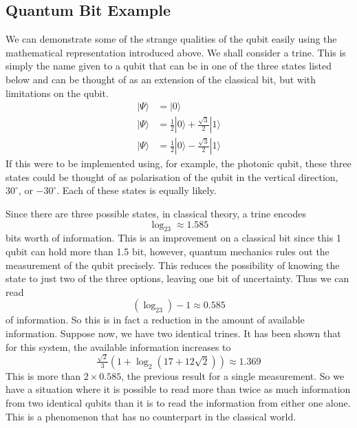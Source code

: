 \subsection{Quantum Bit Example}
We can demonstrate some of the strange qualities of the qubit easily using the mathematical representation introduced above. We shall consider a trine. This is simply the name given to a qubit that can be in one of the three states listed below and can be thought of as an extension of the classical bit, but with limitations on the qubit.
\begin{align*}
	|\Psi\rangle &= |0\rangle\\
	|\Psi\rangle &= \tfrac{1}{2}|0\rangle + \tfrac{\sqrt{3}}{2}|1\rangle\\
	|\Psi\rangle &= \tfrac{1}{2}|0\rangle - \tfrac{\sqrt{3}}{2}|1\rangle
\end{align*}
If this were to be implemented using, for example, the photonic qubit, these three states could be thought of as polarisation of the qubit in the vertical direction, $30^{\circ}$, or $-30^{\circ}$. Each of these states is equally likely.

Since there are three possible states, in classical theory, a trine encodes 
\[
	\log_23 \approx 1.585
\]
bits worth of information. This is an improvement on a classical bit since this 1 qubit can hold more than 1.5 bit, however, quantum mechanics rules out the measurement of the qubit precisely. This reduces the possibility of knowing the state to just two of the three options, leaving one bit of uncertainty. Thus we can read
\[
	(\log_23)-1 \approx 0.585
\] 
of information. So this is in fact a reduction in the amount of available information. Suppose now, we have two identical trines. It has been shown that for this system, the available information increases to
\[
	\tfrac{\sqrt{2}}{3}\left(1+\log_2(17+12\sqrt{2})\right) \approx 1.369
\]
This is more than $2\times0.585$, the previous result for a single measurement. So we have a situation where it is possible to read more than twice as much information from two identical qubits than it is to read the information from either one alone. This is a phenomenon that has no counterpart in the classical world.
